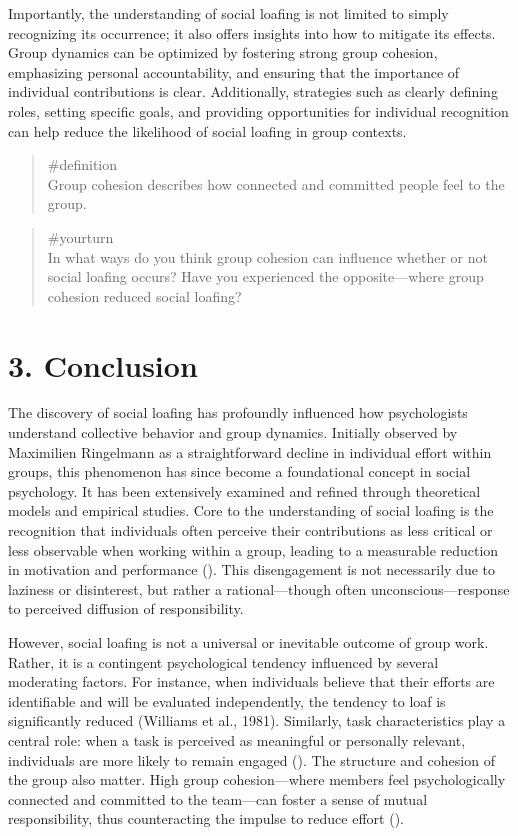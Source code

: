 \documentclass[
  letterpaper,
]{book}
\begin{document}
Importantly, the understanding of social loafing is not limited to
simply recognizing its occurrence; it also offers insights into how to
mitigate its effects. Group dynamics can be optimized by fostering
strong group cohesion, emphasizing personal accountability, and ensuring
that the importance of individual contributions is clear. Additionally,
strategies such as clearly defining roles, setting specific goals, and
providing opportunities for individual recognition can help reduce the
likelihood of social loafing in group contexts.

\begin{quote}
\label{def-groupcohesion}{\#definition}\\
Group cohesion describes how connected and committed people feel to the
group.
\end{quote}

\begin{quote}
{\#yourturn}\\
In what ways do you think group cohesion can influence whether or not
social loafing occurs? Have you experienced the opposite---where group
cohesion reduced social loafing?
\end{quote}

\section{3. Conclusion}\label{conclusion-8}

The discovery of social loafing has profoundly influenced how
psychologists understand collective behavior and group dynamics.
Initially observed by Maximilien Ringelmann as a straightforward decline
in individual effort within groups, this phenomenon has since become a
foundational concept in social psychology. It has been extensively
examined and refined through theoretical models and empirical studies.
Core to the understanding of social loafing is the recognition that
individuals often perceive their contributions as less critical or less
observable when working within a group, leading to a measurable
reduction in motivation and performance
(). This
disengagement is not necessarily due to laziness or disinterest, but
rather a rational---though often unconscious---response to perceived
diffusion of responsibility.

However, social loafing is not a universal or inevitable outcome of
group work. Rather, it is a contingent psychological tendency influenced
by several moderating factors. For instance, when individuals believe
that their efforts are identifiable and will be evaluated independently,
the tendency to loaf is significantly reduced (Williams et al., 1981).
Similarly, task characteristics play a central role: when a task is
perceived as meaningful or personally relevant, individuals are more
likely to remain engaged (). The structure and cohesion of the group also matter.
High group cohesion---where members feel psychologically connected and
committed to the team---can foster a sense of mutual responsibility,
thus counteracting the impulse to reduce effort
().
\end{document}
